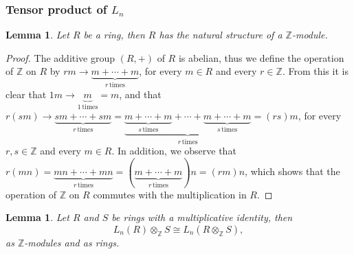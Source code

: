 \documentclass{article}
\newtheorem{lemma4}[paragraph]{Lemma}
\begin{document}
\subsubsection{Tensor product of $L_n$}
\begin{lemma4}
\label{lem:ring-z-module}
Let $R$ be a ring, then $R$ has the natural structure of a $\mathbb{Z}$-module.
\end{lemma4}
\begin{proof}
The additive group $(R,+)$ of $R$ is abelian, thus we define the operation of $\mathbb{Z}$ on $R$ by $rm\longrightarrow\underbrace{m+\cdots+m}_{r\,\text{times}}$, for every $m\in{R}$ and every $r\in\mathbb{Z}$.
From this it is clear that $1m\longrightarrow\underbrace{m}_{1\,\text{times}}=m$, and that $r(sm)\longrightarrow\underbrace{sm+\cdots+sm}_{r\,\text{times}}=\underbrace{\underbrace{m+\cdots+m}_{s\,\text{times}}+\cdots+\underbrace{m+\cdots+m}_{s\,\text{times}}}_{r\,\text{times}}=(rs)m$, for every $r,s\in\mathbb{Z}$ and every $m\in{R}$.
In addition, we observe that $r(mn)=\underbrace{mn+\cdots+mn}_{r\,\text{times}}=(\underbrace{m+\cdots+m}_{r\,\text{times}})n=(rm)n$, which shows that the operation of $\mathbb{Z}$ on ${R}$ commutes with the multiplication in $R$. 
\end{proof}
\begin{lemma4}
\label{lem:tensor-r-s}
Let $R$ and $S$ be rings with a multiplicative identity, then \[L_n(R)\otimes_\mathbb{Z}S\cong{L}_n(R\otimes_\mathbb{Z}S),\]
as $\mathbb{Z}$-modules and as rings.
\end{lemma4}
\end{document}

